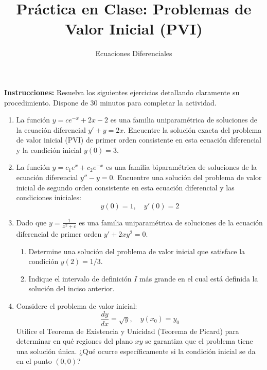\documentclass[12pt]{article}
\title{Práctica en Clase: Problemas de Valor Inicial (PVI)}
\author{Ecuaciones Diferenciales}
\date{}
\begin{document}
\maketitle

\noindent\textbf{Instrucciones:} Resuelva los siguientes ejercicios detallando claramente su procedimiento. Dispone de 30 minutos para completar la actividad.

\vspace{0.8cm}

\begin{enumerate}[label=\textbf{\arabic*.}]
    \item %
    La función $y = c e^{-x} + 2x - 2$ es una familia uniparamétrica de soluciones de la ecuación diferencial $y' + y = 2x$. Encuentre la solución exacta del problema de valor inicial (PVI) de primer orden consistente en esta ecuación diferencial y la condición inicial $y(0) = 3$.

    \vspace{4.5cm}

    \item %
    La función $y = c_1 e^x + c_2 e^{-x}$ es una familia biparamétrica de soluciones de la ecuación diferencial $y'' - y = 0$. Encuentre una solución del problema de valor inicial de segundo orden consistente en esta ecuación diferencial y las condiciones iniciales:
    \[ y(0) = 1, \quad y'(0) = 2 \]

    \vspace{6cm}

    \item %
    Dado que $y = \frac{1}{x^2 + c}$ es una familia uniparamétrica de soluciones de la ecuación diferencial de primer orden $y' + 2xy^2 = 0$.
    \begin{enumerate}[label=\textbf{\alph*)}]
        \item Determine una solución del problema de valor inicial que satisface la condición $y(2) = 1/3$.
        \item Indique el intervalo de definición $I$ más grande en el cual está definida la solución del inciso anterior.
    \end{enumerate}

    \vspace{6cm}

    \item %
    Considere el problema de valor inicial: 
    \[ \frac{dy}{dx} = \sqrt{y}, \quad y(x_0) = y_0 \]
    Utilice el Teorema de Existencia y Unicidad (Teorema de Picard) para determinar en qué regiones del plano $xy$ se garantiza que el problema tiene una solución única. ¿Qué ocurre específicamente si la condición inicial se da en el punto $(0,0)$?

\end{enumerate}
\end{document}
